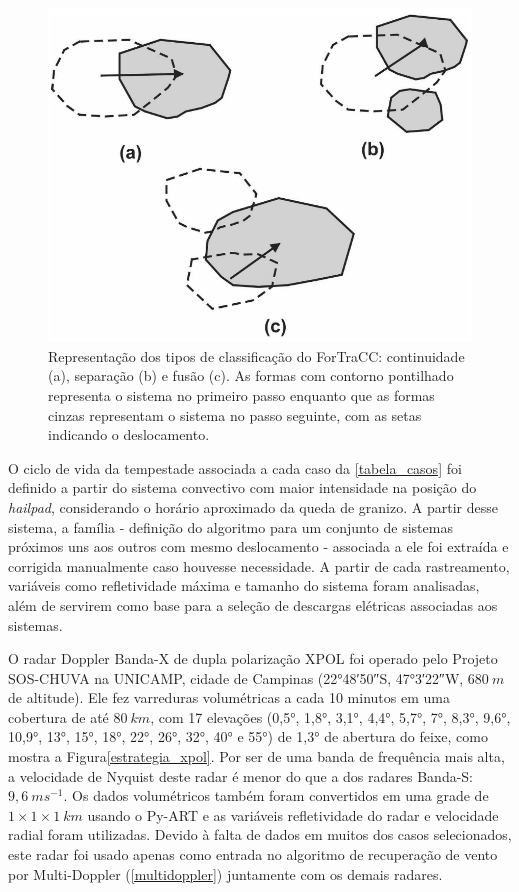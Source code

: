 \begin{figure}[htb]
	\begin{center}
		\caption{Representação dos tipos de classificação do ForTraCC: continuidade (a), separação (b) e fusão (c). As formas com contorno pontilhado representa o sistema no primeiro passo enquanto que as formas cinzas representam o sistema no passo seguinte, com as setas indicando o deslocamento.} 
		\label{fortracc_teoria}
		\includegraphics[width=0.5\columnwidth]{figs/fortracc_classes.png}
	\end{center}
\end{figure}

O ciclo de vida da tempestade associada a cada caso da \autoref{tabela_casos} foi definido a partir do sistema convectivo com maior intensidade na posição do \textit{hailpad}, considerando o horário aproximado da queda de granizo. A partir desse sistema, a família - definição do algoritmo para um conjunto de sistemas próximos uns aos outros com mesmo deslocamento - associada a ele foi extraída e corrigida manualmente caso houvesse necessidade. A partir de cada rastreamento, variáveis como refletividade máxima e tamanho do sistema foram analisadas, além de servirem como base para a seleção de descargas elétricas associadas aos sistemas.

O radar Doppler Banda-X de dupla polarização XPOL foi operado pelo Projeto SOS-CHUVA na UNICAMP, cidade de Campinas (\ang{22;48;50}\:S, \ang{47;3;22}\:W, $680\:m$ de altitude). Ele fez varreduras volumétricas a cada 10 minutos em uma cobertura de até $80\:km$, com 17 elevações (\ang{0,5}, \ang{1,8}, \ang{3,1}, \ang{4,4}, \ang{5,7}, \ang{7}, \ang{8,3}, \ang{9,6}, \ang{10,9}, \ang{13}, \ang{15}, \ang{18}, \ang{22}, \ang{26}, \ang{32}, \ang{40} e \ang{55}) de \ang{1,3} de abertura do feixe, como mostra a Figura\autoref{estrategia_xpol}. Por ser de uma banda de frequência mais alta, a velocidade de Nyquist deste radar é menor do que a dos radares Banda-S: $9,6\:ms^{-1}$. Os dados volumétricos também foram convertidos em uma grade de $1 \times 1 \times 1\:km$ usando o Py-ART \cite{Helmus2016} e as variáveis refletividade do radar e velocidade radial foram utilizadas. Devido à falta de dados em muitos dos casos selecionados, este radar foi usado apenas como entrada no algoritmo de recuperação de vento por Multi-Doppler (\autoref{multidoppler}) juntamente com os demais radares.

